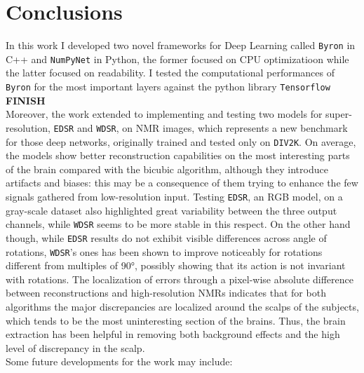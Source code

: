 \documentclass[12pt,a4paper]{report}
\begin{document}
\newpage

\chapter{Conclusions}
In this work I developed two novel frameworks for Deep Learning called {\tt Byron} in C++ and {\tt NumPyNet} in Python, the former focused on CPU optimizatioon while the latter focused on readability.
I tested the computational performances of {\tt Byron} for the most important layers against the python library {\tt Tensorflow} {\bf FINISH}
\\
Moreover, the work extended to implementing and testing two models for super-resolution, {\tt EDSR} and {\tt WDSR}, on NMR images, which represents a new benchmark for those deep networks, originally trained and tested only on {\tt DIV2K}.
On average, the models show better reconstruction capabilities on the most interesting parts of the brain compared with the bicubic algorithm, although they introduce artifacts and biases: this may be a consequence of them trying to enhance the few signals gathered from low-resolution input. 
Testing {\tt EDSR}, an RGB model, on a gray-scale dataset also highlighted great variability between the three output channels, while {\tt WDSR} seems to be more stable in this respect.
On the other hand though, while {\tt EDSR} results do not exhibit visible differences across angle of rotations, {\tt WDSR}'s ones has been shown to improve noticeably for rotations different from multiples of 90°, possibly showing that its action is not invariant with rotations.
The localization of errors through a pixel-wise absolute difference between reconstructions and high-resolution NMRs indicates that for both algorithms the major discrepancies are localized around the scalps of the subjects, which tends to be the most uninteresting section of the brains.
Thus, the brain extraction has been helpful in removing both background effects and the high level of discrepancy in the scalp. 
\\
Some future developments for the work may include:
\end{document}
